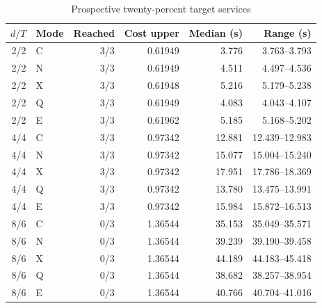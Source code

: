 \begin{table}[htbp]
\centering\caption{Prospective twenty-percent target services}\label{tab:target20-57}
{\small\setlength{\tabcolsep}{4pt}\begin{tabular}{rlrrrr}
\hline
$d/T$ & Mode & Reached & Cost upper & Median (s) & Range (s) \\
\hline
2/2 & C & 3/3 & 0.61949 & 3.776 & 3.763--3.793 \\
2/2 & N & 3/3 & 0.61949 & 4.511 & 4.497--4.536 \\
2/2 & X & 3/3 & 0.61948 & 5.216 & 5.179--5.238 \\
2/2 & Q & 3/3 & 0.61949 & 4.083 & 4.043--4.107 \\
2/2 & E & 3/3 & 0.61962 & 5.185 & 5.168--5.202 \\
4/4 & C & 3/3 & 0.97342 & 12.881 & 12.439--12.983 \\
4/4 & N & 3/3 & 0.97342 & 15.077 & 15.004--15.240 \\
4/4 & X & 3/3 & 0.97342 & 17.951 & 17.786--18.369 \\
4/4 & Q & 3/3 & 0.97342 & 13.780 & 13.475--13.991 \\
4/4 & E & 3/3 & 0.97342 & 15.984 & 15.872--16.513 \\
8/6 & C & 0/3 & 1.36544 & 35.153 & 35.049--35.571 \\
8/6 & N & 0/3 & 1.36544 & 39.239 & 39.190--39.458 \\
8/6 & X & 0/3 & 1.36544 & 44.189 & 44.183--45.418 \\
8/6 & Q & 0/3 & 1.36544 & 38.682 & 38.257--38.954 \\
8/6 & E & 0/3 & 1.36544 & 40.766 & 40.704--41.016 \\
\hline\end{tabular}}
\par{}
\end{table}
